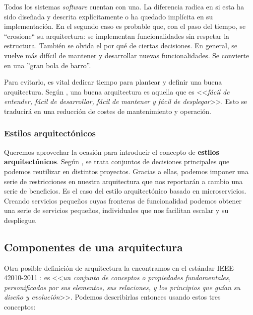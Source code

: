 Todos los sistemas \emph{software} cuentan con una. La diferencia radica en si esta ha sido diseñada y descrita explícitamente o ha quedado implícita en su implementación. \cite{taylorSoftwareArchitectureFoundations2009} En el segundo caso es probable que, con el paso del tiempo, se ``erosione`` su arquitectura: se implementan funcionalidades sin respetar la estructura. También se olvida el por qué de ciertas decisiones. En general, se vuelve más difícil de mantener y desarrollar nuevas funcionalidades. Se convierte en una ''gran bola de barro''. \cite{footeBigBallMud1997}

Para evitarlo, es vital dedicar tiempo para plantear y definir una buena arquitectura. Según \cite{martinChapter15What2018}, una buena arquitectura es aquella que es <<\emph{fácil de entender, fácil de desarrollar, fácil de mantener y fácil de desplegar}>>. Esto se traducirá en una reducción de costes de mantenimiento y operación.

\subsubsection{Estilos arquitectónicos}

Queremos aprovechar la ocasión para introducir el concepto de \textbf{estilos arquitectónicos}. Según \cite{taylorSoftwareArchitectureFoundations2009}, se trata conjuntos de decisiones principales que podemos reutilizar en distintos proyectos. Gracias a ellas, podemos imponer una serie de restricciones en nuestra arquitectura que nos reportarán a cambio una serie de beneficios. Es el caso del estilo arquitectónico basado en microservicios. Creando servicios pequeños cuyas fronteras de funcionalidad  podemos obtener una serie de servicios pequeños, individuales que nos facilitan escalar y su despliegue. \cite{newmanBuildingMicroservicesDesigning2021}

\subsection{Componentes de una arquitectura}

Otra posible definición de arquitectura la encontramos en el estándar IEEE 42010-2011 \cite{ieeeStandard420102011Systems2011}: es <<\emph{un conjunto de conceptos o propiedades fundamentales, personificados por sus elementos, sus relaciones, y los principios que guían su diseño y evolución}>>. Podemos describirlas entonces usando estos tres conceptos: \cite{perryFoundationsStudySoftware1992}

